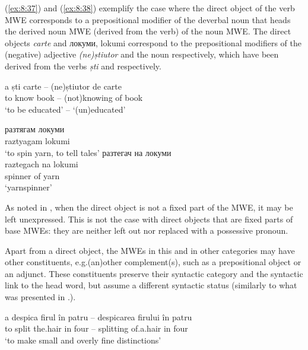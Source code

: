 \documentclass[output=paper]{langsci/langscibook}
\begin{document}
(\ref{ex:8:37}) and (\ref{ex:8:38}) exemplify the case where the direct object of the verb MWE
corresponds to a prepositional modifier of the deverbal noun that heads
the derived noun MWE (derived from the verb) of the noun MWE. The
direct objects \textit{carte} and локуми, lokumi  correspond to the prepositional
modifiers of the (negative) adjective \textit{(ne)știutor} and the noun
 respectively, which have been derived from the verbs \textit{ști}
and  respectively.


\begin{exe}
\ex \label{ex:8:37}
\settowidth{}
\gll a ști carte -- (ne)știutor de carte \\
to know book  -- (not)knowing of book \\ 
\glt ‘to be educated’ -- ‘(un)educated’
\end{exe}

\begin{exe}
\ex \label{ex:8:38}
\begin{xlist}
\ex \label{ex:8:38a}
\settowidth{}
\gll разтягам локуми\\
raztyagam lokumi\\  
‘to spin yarn, to tell tales’
\ex \label{ex:8:38b}
\settowidth{}
\glll разтегач на локуми\\
raztegach na lokumi\\
spinner of yarn \\
\glt ‘yarnspinner’
\end{xlist}
\end{exe}


As noted in , when the direct object is not a fixed part of the MWE,
it may be left unexpressed. This is not the case with direct objects
that are fixed parts of base MWEs: they are neither left out nor
replaced with a possessive pronoun.



Apart from a direct object, the MWEs in this and in other categories may
have other constituents, e.g.\@ (an)other complement(s), such as a
prepositional object or an adjunct. These constituents preserve their
syntactic category and the syntactic link to the head word, but assume
a different syntactic status (similarly to what was presented in .).


\begin{exe}
\ex \label{ex:8:39}
\settowidth{}
\gll a despica firul în patru -- despicarea firului în patru\\
to  split  {the.hair} in four --  splitting {of.a.hair} in four \\ 
\glt ‘to make small and overly fine distinctions’ 
\end{exe}
\end{document}
